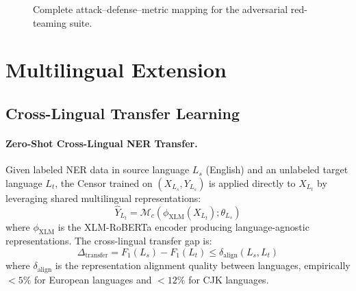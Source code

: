 \documentclass[11pt, a4paper]{article}
\begin{document}
\begin{figure}[H]
{%
}
\caption{Complete attack--defense--metric mapping for the adversarial red-teaming suite.}
\end{figure}

\section{Multilingual Extension}
\label{sec:multilingual}

\subsection{Cross-Lingual Transfer Learning}

\paragraph{Zero-Shot Cross-Lingual NER Transfer.}
Given labeled NER data in source language $L_s$ (English) and an unlabeled target language $L_t$, the Censor trained on $(X_{L_s}, Y_{L_s})$ is applied directly to $X_{L_t}$ by leveraging shared multilingual representations:
\begin{equation}
\hat{Y}_{L_t} = \mathcal{M}_c(\phi_{\text{XLM}}(X_{L_t}); \theta_{L_s})
\end{equation}
where $\phi_{\text{XLM}}$ is the XLM-RoBERTa encoder producing language-agnostic representations. The cross-lingual transfer gap is:
\begin{equation}
\Delta_{\text{transfer}} = F_1(L_s) - F_1(L_t) \leq \delta_{\text{align}}(L_s, L_t)
\end{equation}
where $\delta_{\text{align}}$ is the representation alignment quality between languages, empirically $< 5\%$ for European languages and $< 12\%$ for CJK languages.
\end{document}
